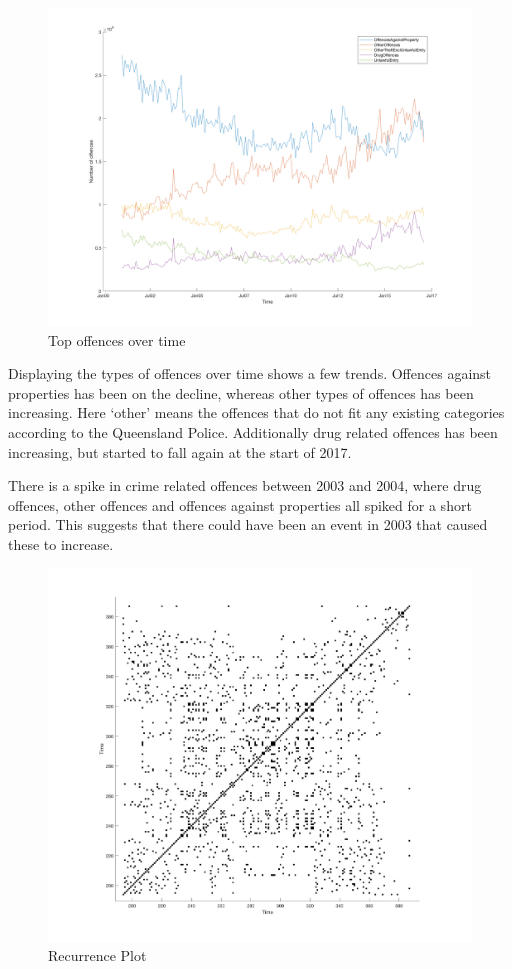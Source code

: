 \documentclass[]{article}
\begin{document}
\begin{figure}[H]
    \caption{Top offences over time}
    \centering
    \includegraphics[width=\linewidth]{../images/top_offences_over_time}
\end{figure}

Displaying the types of offences over time shows a few trends.
Offences against properties has been on the decline, whereas other
types of offences has been increasing. Here `other' means the
offences that do not fit any existing categories according to the Queensland Police.
Additionally drug related offences has been increasing, but started to fall again at the start of 2017.

There is a spike in crime related offences between 2003 and 2004, where drug offences, other offences
and offences against properties all spiked for a short period. This suggests that
there could have been an event in 2003 that caused these to increase.

\begin{figure}[H]
    \caption{Recurrence Plot}
    \centering
    \includegraphics[width=\linewidth]{../images/recurrence_plot}
\end{figure}
\end{document}
